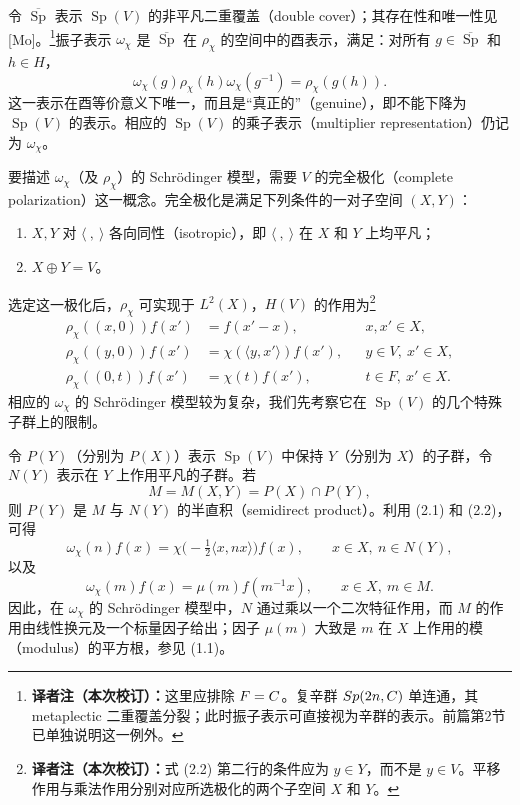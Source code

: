 令 $\overline{\operatorname{Sp}}$ 表示 $\operatorname{Sp}(V)$ 的非平凡二重覆盖（double cover）；其存在性和唯一性见 [Mo]。\footnote{\textbf{译者注（本次校订）：}这里应排除 $F=C$。复辛群 $Sp(2n,C)$ 单连通，其 metaplectic 二重覆盖分裂；此时振子表示可直接视为辛群的表示。前篇第2节已单独说明这一例外。}振子表示 $\omega_\chi$ 是 $\overline{\operatorname{Sp}}$ 在 $\rho_\chi$ 的空间中的酉表示，满足：对所有 $g\in\overline{\operatorname{Sp}}$ 和 $h\in H$，
\begin{equation}
 \omega_\chi(g)\rho_\chi(h)\omega_\chi(g^{-1})=\rho_\chi(g(h)).\tag{2.1}
\end{equation}
这一表示在酉等价意义下唯一，而且是“真正的”（genuine），即不能下降为 $\operatorname{Sp}(V)$ 的表示。相应的 $\operatorname{Sp}(V)$ 的乘子表示（multiplier representation）仍记为 $\omega_\chi$。

要描述 $\omega_\chi$（及 $\rho_\chi$）的 Schrödinger 模型，需要 $V$ 的完全极化（complete polarization）这一概念。完全极化是满足下列条件的一对子空间 $(X,Y)$：
\begin{enumerate}
\item[(i)] $X,Y$ 对 $\langle\ ,\ \rangle$ 各向同性（isotropic），即 $\langle\ ,\ \rangle$ 在 $X$ 和 $Y$ 上均平凡；
\item[(ii)] $X\oplus Y=V$。
\end{enumerate}
选定这一极化后，$\rho_\chi$ 可实现于 $L^2(X)$，$H(V)$ 的作用为\footnote{\textbf{译者注（本次校订）：}式 (2.2) 第二行的条件应为 $y\in Y$，而不是 $y\in V$。平移作用与乘法作用分别对应所选极化的两个子空间 $X$ 和 $Y$。}
\begin{equation}
\begin{aligned}
 \rho_\chi((x,0))f(x')&=f(x'-x),&&x,x'\in X,\\
 \rho_\chi((y,0))f(x')&=\chi(\langle y,x'\rangle)f(x'),&&y\in V,\ x'\in X,\\
 \rho_\chi((0,t))f(x')&=\chi(t)f(x'),&&t\in F,\ x'\in X.
\end{aligned}\tag{2.2}
\end{equation}
相应的 $\omega_\chi$ 的 Schrödinger 模型较为复杂，我们先考察它在 $\operatorname{Sp}(V)$ 的几个特殊子群上的限制。

令 $P(Y)$（分别为 $P(X)$）表示 $\operatorname{Sp}(V)$ 中保持 $Y$（分别为 $X$）的子群，令 $N(Y)$ 表示在 $Y$ 上作用平凡的子群。若
\[
 M=M(X,Y)=P(X)\cap P(Y),
\]
则 $P(Y)$ 是 $M$ 与 $N(Y)$ 的半直积（semidirect product）。利用 (2.1) 和 (2.2)，可得
\begin{equation}
 \omega_\chi(n)f(x)=\chi\bigl(-\tfrac12\langle x,nx\rangle\bigr)f(x),
 \qquad x\in X,\ n\in N(Y),\tag{2.3}
\end{equation}
以及
\begin{equation}
 \omega_\chi(m)f(x)=\mu(m)f(m^{-1}x),\qquad x\in X,\ m\in M.\tag{2.4}
\end{equation}
因此，在 $\omega_\chi$ 的 Schrödinger 模型中，$N$ 通过乘以一个二次特征作用，而 $M$ 的作用由线性换元及一个标量因子给出；因子 $\mu(m)$ 大致是 $m$ 在 $X$ 上作用的模（modulus）的平方根，参见 (1.1)。

